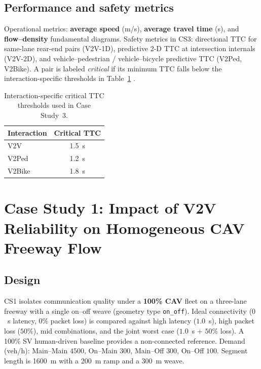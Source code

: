 \documentclass[numbered]{trbunofficial}
\begin{document}
\subsection{Performance and safety metrics}
Operational metrics: \textbf{average speed} (m/s), \textbf{average travel time} (s), and
\textbf{flow--density} fundamental diagrams. Safety metrics in CS3: directional TTC for
same-lane rear-end pairs (V2V-1D), predictive 2-D TTC at intersection internals (V2V-2D), and
vehicle--pedestrian / vehicle--bicycle predictive TTC (V2Ped, V2Bike). A pair is labeled
\emph{critical} if its minimum TTC falls below the interaction-specific thresholds in
Table~\ref{tab:ttc_thresh} \cite{Lenard2018}.

\begin{table}[htbp]
  \centering
  \caption{Interaction-specific critical TTC thresholds used in Case Study~3.}
  \label{tab:ttc_thresh}
  \small
  \begin{tabular}{@{}lc@{}}
    \toprule
    Interaction & Critical TTC \\
    \midrule
    V2V & 1.5~s \\
    V2Ped & 1.2~s \\
    V2Bike & 1.8~s \\
    \bottomrule
  \end{tabular}
\end{table}

\section{Case Study 1: Impact of V2V Reliability on Homogeneous CAV Freeway Flow}
\label{sec:cs1}

\subsection{Design}
CS1 isolates communication quality under a \textbf{100\% CAV} fleet on a three-lane freeway
with a single on--off weave (geometry type \texttt{on\_off}). Ideal connectivity
($0$~s latency, $0\%$ packet loss) is compared against high latency ($1.0$~s), high packet
loss ($50\%$), mid combinations, and the joint worst case ($1.0$~s + $50\%$ loss). A
100\% SV human-driven baseline provides a non-connected reference. Demand (veh/h):
Main--Main $4500$, On--Main $300$, Main--Off $300$, On--Off $100$. Segment length is
1600~m with a 200~m ramp and a 300~m weave.
\end{document}
